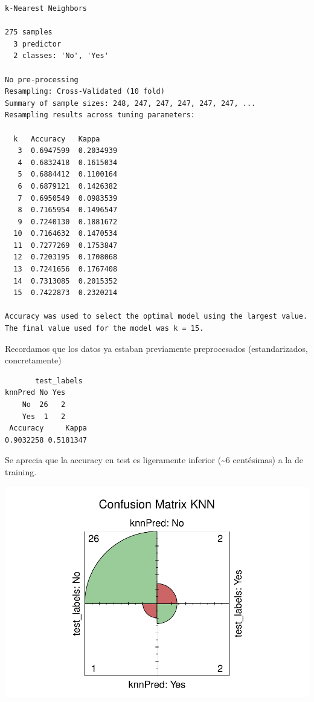 \documentclass[
]{article}
\begin{document}
\begin{verbatim}
k-Nearest Neighbors 

275 samples
  3 predictor
  2 classes: 'No', 'Yes' 

No pre-processing
Resampling: Cross-Validated (10 fold) 
Summary of sample sizes: 248, 247, 247, 247, 247, 247, ... 
Resampling results across tuning parameters:

  k   Accuracy   Kappa    
   3  0.6947599  0.2034939
   4  0.6832418  0.1615034
   5  0.6884412  0.1100164
   6  0.6879121  0.1426382
   7  0.6950549  0.0983539
   8  0.7165954  0.1496547
   9  0.7240130  0.1881672
  10  0.7164632  0.1470534
  11  0.7277269  0.1753847
  12  0.7203195  0.1708068
  13  0.7241656  0.1767408
  14  0.7313085  0.2015352
  15  0.7422873  0.2320214

Accuracy was used to select the optimal model using the largest value.
The final value used for the model was k = 15.
\end{verbatim}

Recordamos que los datos ya estaban previamente preprocesados
(estandarizados, concretamente)

\begin{verbatim}
       test_labels
knnPred No Yes
    No  26   2
    Yes  1   2
 Accuracy     Kappa 
0.9032258 0.5181347 
\end{verbatim}

Se aprecia que la accuracy en test es ligeramente inferior
(\textasciitilde6 centésimas) a la de training.

\begin{center}\includegraphics{Clasificacion_files/figure-latex/unnamed-chunk-11-1} \end{center}
\end{document}
